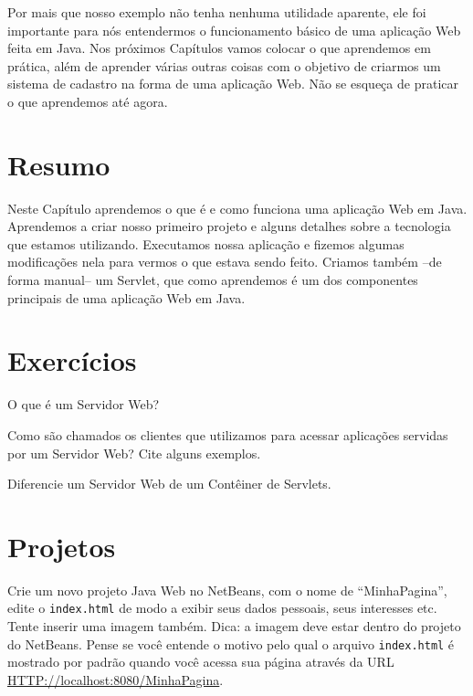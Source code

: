 Por mais que nosso exemplo não tenha nenhuma utilidade aparente, ele foi importante para nós entendermos o funcionamento básico de uma aplicação Web feita em Java. Nos próximos Capítulos vamos colocar o que aprendemos em prática, além de aprender várias outras coisas com o objetivo de criarmos um sistema de cadastro na forma de uma aplicação Web. Não se esqueça de praticar o que aprendemos até agora. 


\section{Resumo}

Neste Capítulo aprendemos o que é e como funciona uma aplicação Web em Java. Aprendemos a criar nosso primeiro projeto e alguns detalhes sobre a tecnologia que estamos utilizando. Executamos nossa aplicação e fizemos algumas modificações nela para vermos o que estava sendo feito. Criamos também –de forma manual– um Servlet, que como aprendemos é um dos componentes principais de uma aplicação Web em Java.


\section{Exercícios}

\begin{exercicioSemArquivo}{}{}{}
    O que é um Servidor Web?
\end{exercicioSemArquivo}

\begin{exercicioSemArquivo}{}{}{}
    Como são chamados os clientes que utilizamos para acessar aplicações servidas por um Servidor Web? Cite alguns exemplos.
\end{exercicioSemArquivo}

\begin{exercicioSemArquivo}{}{}{}
    Diferencie um Servidor Web de um Contêiner de Servlets.
\end{exercicioSemArquivo}


\section{Projetos}

\begin{projetoSemArquivo}{}{}{}
    Crie um novo projeto Java Web no NetBeans, com o nome de ``MinhaPagina'', edite o \texttt{index.html} de modo a exibir seus dados pessoais, seus interesses etc. Tente inserir uma imagem também. Dica: a imagem deve estar dentro do projeto do NetBeans. Pense se você entende o motivo pelo qual o arquivo \texttt{index.html} é mostrado por padrão quando você acessa sua página através da URL \url{HTTP://localhost:8080/MinhaPagina}.
\end{projetoSemArquivo}

